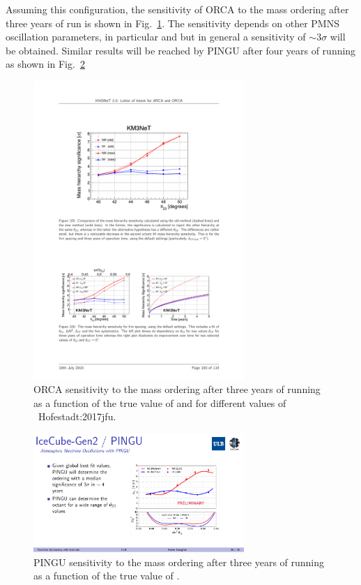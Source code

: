 Assuming this configuration, the sensitivity of ORCA to the mass ordering after three years of run is shown in Fig.~\ref{fig:orcasensi}. The sensitivity depends on other PMNS oscillation parameters, in particular \thatm and \dcp but in general a sensitivity of $\sim3\sigma$ will be obtained. Similar results will be reached by PINGU after four years of running as shown in Fig.~\ref{fig:pingusensi}

\begin{figure} [htbp!]
\begin{center}
\includegraphics[width=8cm]{figures/orca_sensi.pdf}
\caption{\label{fig:orcasensi} ORCA sensitivity to the mass ordering after three years of running as a function of the true value of \thatm and for different values of \dcp~{Hofestadt:2017jfu}.}
\end{center}
\end{figure}

\begin{figure} [htbp!]
\begin{center}
\includegraphics[width=8cm]{figures/pingu_sensi.pdf}
\caption{\label{fig:pingusensi} PINGU sensitivity to the mass ordering after three years of running as a function of the true value of \thatm.}
\end{center}
\end{figure}


